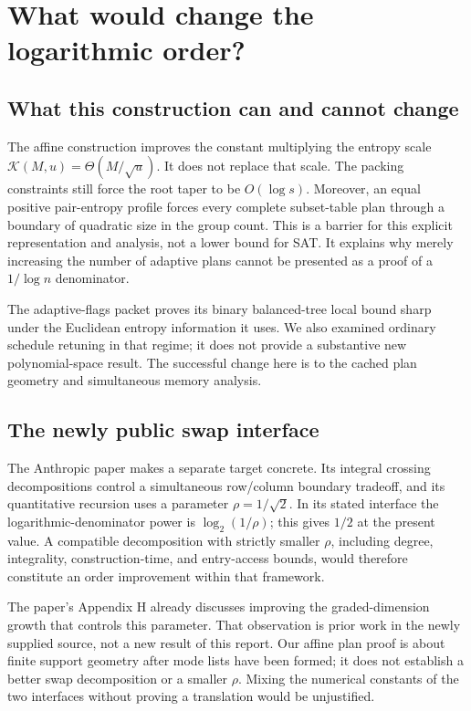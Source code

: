 \documentclass[11pt]{article}
\theoremstyle{definition}\newtheorem{definition}[theorem]{Definition}
\theoremstyle{remark}\newtheorem{remark}[theorem]{Remark}
\newcommand{\K}{\mathcal K}
\begin{document}
\section{What would change the logarithmic order?}
\label{sec:frontier}

\subsection{What this construction can and cannot change}
The affine construction improves the constant multiplying the entropy
scale $\K(M,u)=\Theta(M/\sqrt u)$. It does not replace that scale.
The packing constraints still force the root taper to be $O(\log s)$.
Moreover, an equal positive pair-entropy profile forces every complete
subset-table plan through a boundary of quadratic size in the group
count. This is a barrier for this explicit representation and analysis,
not a lower bound for SAT. It explains why merely increasing the number
of adaptive plans cannot be presented as a proof of a $1/\log n$
denominator.

The adaptive-flags packet proves its binary balanced-tree local bound
sharp under the Euclidean entropy information it uses. We also examined
ordinary schedule retuning in that regime; it does not provide a
substantive new polynomial-space result. The successful change here
is to the cached plan geometry and simultaneous memory analysis.

\subsection{The newly public swap interface}
The Anthropic paper makes a separate target concrete. Its integral
crossing decompositions control a simultaneous row/column boundary
tradeoff, and its quantitative recursion uses a parameter
$\rho=1/\sqrt2$. In its stated interface the logarithmic-denominator
power is $\log_2(1/\rho)$; this gives $1/2$ at the present value.
A compatible decomposition with strictly smaller $\rho$, including
degree, integrality, construction-time, and entry-access bounds, would
therefore constitute an order improvement within that framework.

The paper's Appendix H already discusses improving the graded-dimension
growth that controls this parameter. That observation is prior work in
the newly supplied source, not a new result of this report. Our affine
plan proof is about finite support geometry after mode lists have been
formed; it does not establish a better swap decomposition or a smaller
$\rho$. Mixing the numerical constants of the two interfaces without
proving a translation would be unjustified.
\end{document}
